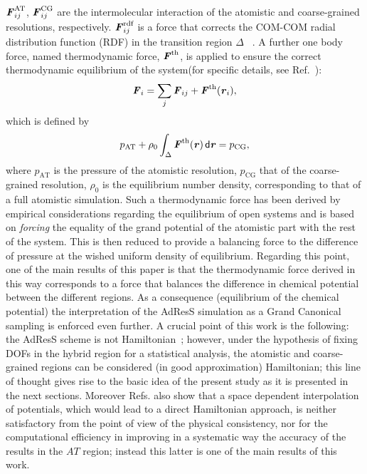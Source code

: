 \documentclass[aip,jcp,a4paper,reprint,onecolumn]{revtex4-1}
\newcommand{\redc}[1]{{\color{red} #1}}
\newcommand{\vect}[1]{\textbf{\textit{#1}}}
\newcommand{\dd}[1]{\textsf{#1}}
\newcommand{\AT}{{\textrm{{AT}}}}
\newcommand{\CG}{{\textrm{CG}}}
\newcommand{\rdf}{{\textrm{rdf}}}
\begin{document}
$ \vect F^{\AT}_{ij}$, $ \vect F^{\CG}_{ij}$
are the intermolecular interaction of the atomistic and coarse-grained
resolutions, respectively.
$\vect F_{ij}^{\rdf}$ is a force that corrects the COM-COM radial distribution function (RDF) in the transition region $\Delta$ ~\cite{rdfcorr}. A further one body force, named thermodynamic force, ${\vect F}^{\textrm{th}}$, is applied to ensure the correct thermodynamic equilibrium of the system(for specific details, see Ref.~):
\begin{equation}
  {\vect F}_{i}=
  \sum_{j}{\vect F}_{ij}+
  {\vect F}^{\textrm{th}}(\vect r_i),
\label{mody}
\end{equation}
which is defined by
\begin{equation}
  p_{\AT}+
  \rho_0
  \int_{\Delta} {\vect F}^\text{th}(\vect r)\,\dd d\vect r
  =p_{\CG},
  \label{thf}
\end{equation}
where $p_{\AT}$ is the pressure of the atomistic resolution, $p_{\CG}$ that of the coarse-grained resolution, $\rho_{0}$ is the equilibrium number density, corresponding to that of a full atomistic simulation.
Such a thermodynamic force has been derived by empirical considerations regarding the equilibrium of open systems and is based on {\it forcing} the equality of the grand potential of the atomistic part with the rest of the system.
This is then reduced to provide a balancing force to the difference of pressure at the wished uniform density of equilibrium. Regarding this point, one of the main results of this paper is that the thermodynamic force derived in this way corresponds to a force that balances the difference in chemical potential between the different regions. As a consequence (equilibrium of the chemical potential) the interpretation of the AdResS simulation as a Grand Canonical sampling is enforced even further.
 A crucial point of this work is the following: the 
AdResS scheme is not Hamiltonian~\cite{presolo,prlcomm}; however, \redc{under the hypothesis of fixing DOFs in the hybrid region for a statistical analysis}, the atomistic and
coarse-grained regions can be considered (in good approximation) Hamiltonian; this line of thought gives rise to the basic
idea of the present study as it is presented in the next sections. \redc{Moreover Refs.\cite{presolo,prlcomm} also show that a space dependent interpolation of potentials, which would lead to a direct Hamiltonian approach, is neither satisfactory from the point of view of the physical consistency, nor for the computational efficiency in improving in a systematic way the accuracy of the results in the $AT$ region; instead this latter is one of the main results of this work.}
\end{document}
